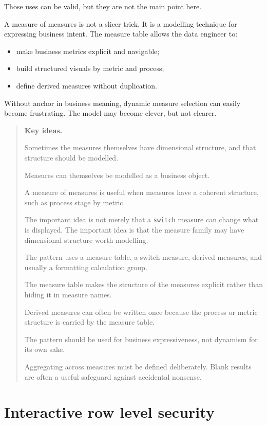 \documentclass[10pt,openany,10pt]{book}
\providecommand{\tightlist}{%
  \setlength{\itemsep}{0pt}\setlength{\parskip}{0pt}}
\begin{document}
Those uses can be valid, but they are not the main point here.

A measure of measures is not a slicer trick. It is a modelling technique
for expressing business intent. The measure table allows the data
engineer to:

\begin{itemize}
\tightlist
\item
  make business metrics explicit and navigable;
\item
  build structured visuals by metric and process;
\item
  define derived measures without duplication.
\end{itemize}

Without anchor in business meaning, dynamic measure selection can easily
become frustrating. The model may become clever, but not clearer.

\begin{quote}
\textbf{Key ideas.}

Sometimes the measures themselves have dimensional structure, and that
structure should be modelled.

Measures can themselves be modelled as a business object.

A measure of measures is useful when measures have a coherent structure,
such as process stage by metric.

The important idea is not merely that a \texttt{switch} measure can
change what is displayed. The important idea is that the measure family
may have dimensional structure worth modelling.

The pattern uses a measure table, a switch measure, derived measures,
and usually a formatting calculation group.

The measure table makes the structure of the measures explicit rather
than hiding it in measure names.

Derived measures can often be written once because the process or metric
structure is carried by the measure table.

The pattern should be used for business expressiveness, not dynamism for
its own sake.

Aggregating across measures must be defined deliberately. Blank results
are often a useful safeguard against accidental nonsense.
\end{quote}

\newpage

\chapter{Interactive row level
security}\label{docs-presenting-insights-interactive-row-level-security}
\end{document}
